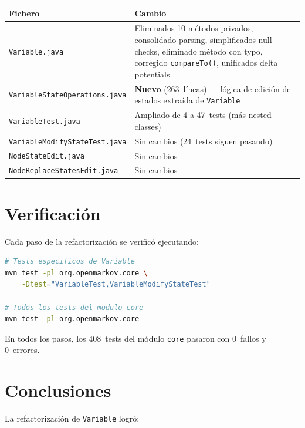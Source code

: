 \documentclass[11pt,a4paper]{article}
\newcommand{\code}[1]{\texttt{#1}}
\begin{document}
\begin{center}
\footnotesize
\begin{tabular}{lp{8cm}}
\toprule
\textbf{Fichero} & \textbf{Cambio} \\
\midrule
\code{Variable.java} & Eliminados 10 m\'etodos privados, consolidado
  parsing, simplificados null checks, eliminado m\'etodo con typo,
  corregido \code{compareTo()}, unificados delta potentials \\
\code{VariableStateOperations.java} & \textbf{Nuevo} (263~l\'ineas) ---
  l\'ogica de edici\'on de estados extra\'ida de \code{Variable} \\
\code{VariableTest.java} & Ampliado de 4 a 47~tests (m\'as nested classes) \\
\code{VariableModifyStateTest.java} & Sin cambios (24~tests siguen pasando) \\
\code{NodeStateEdit.java} & Sin cambios \\
\code{NodeReplaceStatesEdit.java} & Sin cambios \\
\bottomrule
\end{tabular}
\end{center}

\section{Verificaci\'on}
\label{sec:verificacion}

Cada paso de la refactorizaci\'on se verific\'o ejecutando:

\begin{lstlisting}[language=bash, numbers=none]
# Tests especificos de Variable
mvn test -pl org.openmarkov.core \
    -Dtest="VariableTest,VariableModifyStateTest"

# Todos los tests del modulo core
mvn test -pl org.openmarkov.core
\end{lstlisting}

En todos los pasos, los 408~tests del m\'odulo \code{core} pasaron con
0~fallos y 0~errores.

\section{Conclusiones}

La refactorizaci\'on de \code{Variable} logr\'o:
\end{document}
